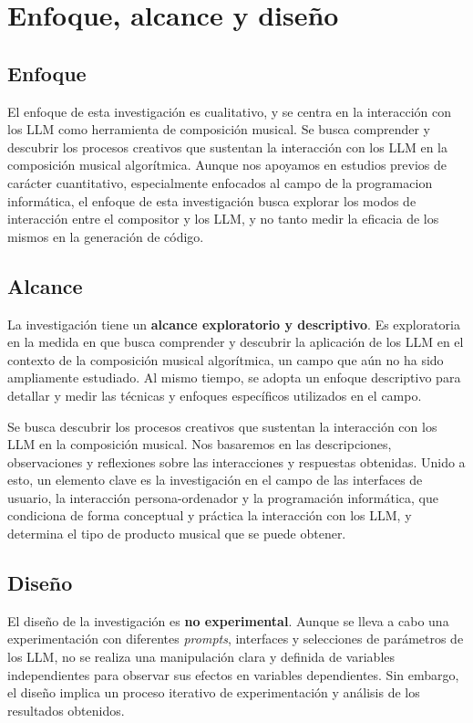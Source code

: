 \section{Enfoque, alcance y diseño}

\subsection{Enfoque}

El enfoque de esta investigación es cualitativo, y se centra en la interacción con los LLM como herramienta de composición musical. Se busca comprender y descubrir los procesos creativos que sustentan la interacción con los LLM en la composición musical algorítmica. Aunque nos apoyamos en estudios previos de carácter cuantitativo, especialmente enfocados al campo de la programacion informática, el enfoque de esta investigación busca explorar los modos de interacción entre el compositor y los LLM, y no tanto medir la eficacia de los mismos en la generación de código. 

\subsection{Alcance}
La investigación tiene un \textbf{alcance exploratorio y descriptivo}. Es exploratoria en la medida en que busca comprender y descubrir la aplicación de los LLM en el contexto de la composición musical algorítmica, un campo que aún no ha sido ampliamente estudiado. Al mismo tiempo, se adopta un enfoque descriptivo para detallar y medir las técnicas y enfoques específicos utilizados en el campo.

Se busca descubrir los procesos creativos que sustentan la interacción con los LLM en la composición musical. Nos basaremos en las descripciones, observaciones y reflexiones sobre las interacciones y respuestas obtenidas. Unido a esto, un elemento clave es la investigación en el campo de las interfaces de usuario, la interacción persona-ordenador y la programación informática, que condiciona de forma conceptual y práctica la interacción con los LLM, y determina el tipo de producto musical que se puede obtener.

\subsection{Diseño}
El diseño de la investigación es \textbf{no experimental}. Aunque se lleva a cabo una experimentación con diferentes \textit{prompts}, interfaces y selecciones de parámetros de los LLM, no se realiza una manipulación clara y definida de variables independientes para observar sus efectos en variables dependientes. Sin embargo, el diseño implica un proceso iterativo de experimentación y análisis de los resultados obtenidos.


